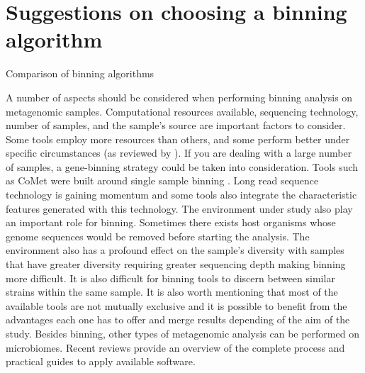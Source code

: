\documentclass{article}
\begin{document}
\section{Suggestions on choosing a binning algorithm}
\begin{table}
\begin{tiny}
\centering
\caption[Comparison of binning algorithms]{Comparison of binning algorithms}
	
\label{Tbinningsoftware}
\end{tiny}
\end{table}
A number of aspects should be considered when performing binning analysis on metagenomic samples.
Computational resources available, sequencing technology, number of samples, and the sample's source are important factors to consider.
Some tools employ more resources than others, and some perform better under specific circumstances (as reviewed by ).
If you are dealing with a large number of samples, a gene-binning strategy could be taken into consideration.
Tools such as CoMet were built around single sample binning \cite{herath2017comet}.
Long read sequence technology is gaining momentum and some tools also integrate the characteristic features generated with this technology.
The environment under study also play an important role for binning.
Sometimes there exists host organisms whose genome sequences would be removed before starting the analysis.
The environment also has a profound effect on the sample's diversity with samples that have greater diversity requiring greater sequencing depth making binning more difficult.
It is also difficult for binning tools to discern between similar strains within the same sample.  
It is also worth mentioning that most of the available tools are not mutually exclusive and it is possible to benefit from the advantages each one has to offer and merge results depending of the aim of the study.
Besides binning, other types of metagenomic analysis can be performed on microbiomes.
Recent reviews provide an overview of the complete process and practical guides to apply available software.  
\end{document}
